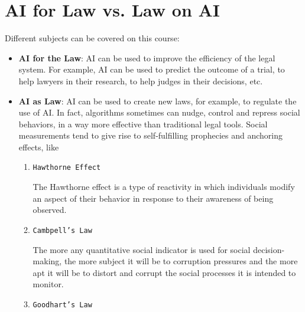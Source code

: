 
\chapter{AI for Law vs. Law on AI}

Different subjects can be covered on this course:
\begin{itemize}
    \item \textbf{AI for the Law}: AI can be used to improve the efficiency of the legal system. For example, AI can be used to predict the outcome of a trial, to help lawyers in their research, to help judges in their decisions, etc.
    \item \textbf{AI as Law}: AI can be used to create new laws, for example, to regulate the use of AI. In fact, algorithms sometimes can nudge, control and repress social behaviors, in a way more effective than traditional legal tools.
    Social measurements tend to give rise to self-fulfilling prophecies and anchoring effects, like
    \begin{enumerate}
        \item \texttt{Hawthorne Effect}
        
        The Hawthorne effect is a type of reactivity in which individuals modify an aspect of their behavior in response to their awareness of being observed.
        \item \texttt{Cambpell's Law}
        
        The more any quantitative social indicator is used for social decision-making, the more subject it will be to corruption pressures and the more apt it will be to distort and corrupt the social processes it is intended to monitor.
        \item \texttt{Goodhart's Law}
        

\end{enumerate}
\end{itemize}
